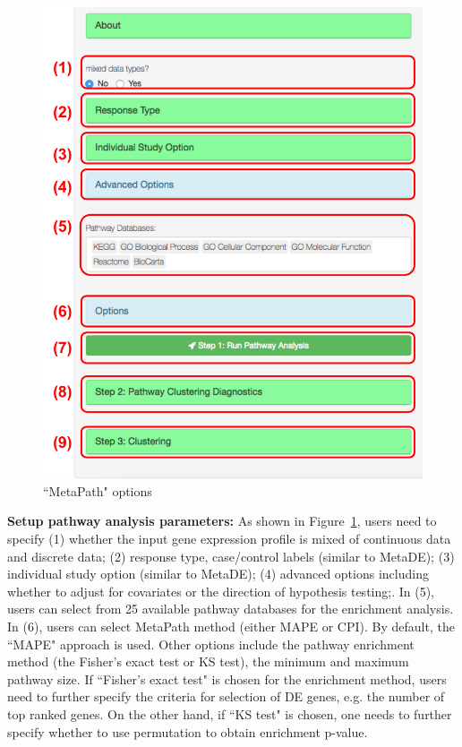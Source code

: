 \begin{figure}[H]
\begin{center}
\includegraphics[scale=0.5]{./figure/metaPath/metaPathoption.pdf}
\caption{``MetaPath" options}
\label{fig:MetaPathoption}
\end{center}
\end{figure}

\textbf{Setup pathway analysis parameters:}
As shown in Figure~\ref{fig:MetaPathoption},
users need to specify {\color{red}(1)} whether the input gene expression profile is mixed of continuous data and discrete data;
{\color{red}(2)} response type, case/control labels (similar to MetaDE);
{\color{red}(3)} individual study option (similar to MetaDE);
{\color{red}(4)} advanced options including whether to adjust for covariates or the direction of hypothesis testing;.
In {\color{red}(5)}, users can select from 25 available pathway databases for the enrichment analysis.
In {\color{red}(6)}, users can select MetaPath method (either MAPE or CPI).
By default, the ``MAPE" approach is used. 
Other options include the pathway enrichment method (the Fisher's exact test or KS test), the minimum and maximum pathway size. If ``Fisher's exact test" is chosen for the enrichment method, users need to further specify the criteria for selection of DE genes, e.g. the number of top ranked genes. On the other hand, if ``KS test" is chosen, one needs to further specify whether to use permutation to obtain enrichment p-value. 

